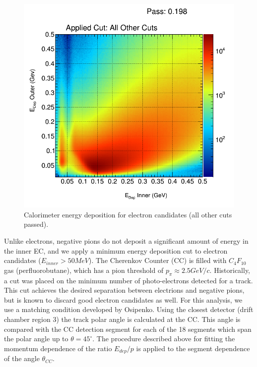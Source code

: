 \begin{figure}
  \label{fig:ec_edep}
  \begin{center}
    \includegraphics[width=\columnwidth]{image/h_ec_edep_allOthers_all.png}
    \caption{Calorimeter energy deposition for electron candidates (all other cuts passed).}
  \end{center}
\end{figure}

Unlike electrons, negative pions do not deposit a significant amount of energy in the inner EC, and we apply a minimum energy deposition cut to electron candidates ($E_{inner} > 50 MeV$).  The Cherenkov Counter (CC) is filled with $C_{4}F_{10}$ gas (perfluorobutane), which has a pion threshold of $p_{\pi} \approx 2.5 GeV/c$.  Historically, a cut was placed on the minimum number of photo-electrons detected for a track.  This cut achieves the desired separation between electrions and negative pions, but is known to discard good electron candidates as well.  For this analysis, we use a matching condition developed by Osipenko.  Using the closest detector (drift chamber region 3) the track polar angle is calculated at the CC.  This angle is compared with the CC detection segment for each of the 18 segments which span the polar angle up to $\theta = 45^{\circ}$.  The procedure described above for fitting the momentum dependence of the ratio $E_{dep}/p$ is applied to the segment dependence of the angle $\theta_{CC}$.  
\\
